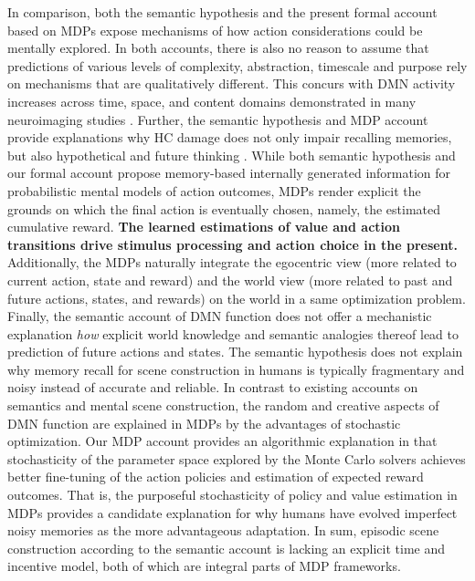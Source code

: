 \documentclass[10pt,letterpaper]{article}
\begin{document}
In comparison,
both the semantic hypothesis and the present formal account based on MDPs
expose mechanisms of how action considerations could be mentally explored.
In both accounts,
there is also no reason to assume that predictions of various
levels of complexity, abstraction, timescale and purpose
rely on mechanisms that are qualitatively different. This concurs with
DMN activity increases across time, space, and content domains
demonstrated in many neuroimaging studies
\citep{spreng2009common, laird2009, bzdok2012morality, binder2009}.
Further, the semantic hypothesis
and MDP account provide explanations why HC damage does
not only impair recalling memories, but also hypothetical and future
thinking \citep{hassabis2007patients}.
While both semantic hypothesis and
our formal account propose memory-based internally
generated information for probabilistic mental models of action outcomes,
MDPs render explicit the grounds on which the final action is
eventually chosen, namely, the estimated cumulative reward.
\textbf{The learned
estimations of value and action transitions drive
stimulus processing and action choice in the present.}
Additionally,
the MDPs naturally integrate the egocentric view
(more related to current action, state and reward) and the
world view (more related to past and future actions, states, and rewards)
on the world in a same optimization problem.
Finally,
the semantic account of DMN function does not offer
a mechanistic explanation \textit{how}
explicit world knowledge and semantic analogies thereof
lead to prediction of future actions and states.
The semantic hypothesis does not explain why memory recall
for scene construction in humans is typically fragmentary and noisy
instead of accurate and reliable.
In contrast to existing accounts on semantics and
mental scene construction, the random and creative aspects of DMN function
are explained in MDPs by the advantages of stochastic optimization.
Our MDP account provides an algorithmic explanation in that
stochasticity of the parameter space explored
by the Monte Carlo solvers achieves better fine-tuning of the
action policies and estimation of expected reward outcomes.
That is, the purposeful stochasticity of policy and value estimation
in MDPs provides a candidate explanation for why humans
have evolved imperfect noisy memories
as the more advantageous adaptation.
In sum, episodic scene construction according to the semantic
account is lacking an explicit time and incentive model,
both of which are integral parts of MDP frameworks.
\end{document}
